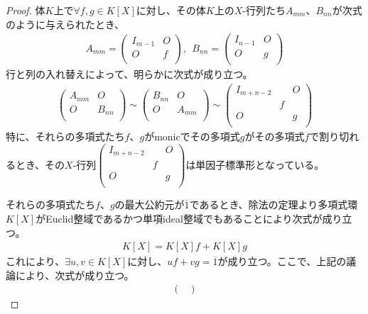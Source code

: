 \documentclass[dvipdfmx]{jsarticle}
\begin{document}
\begin{proof}
体$K$上で$\forall f,g \in K[ X]$に対し、その体$K$上の$X$-行列たち$A_{mm}$、$B_{nn}$が次式のように与えられたとき、
\begin{align*}
A_{mm} = \begin{pmatrix}
I_{m - 1} & O \\
O & f \\
\end{pmatrix},\ \ B_{nn} = \begin{pmatrix}
I_{n - 1} & O \\
O & g \\
\end{pmatrix}
\end{align*}
行と列の入れ替えによって、明らかに次式が成り立つ。
\begin{align*}
\begin{pmatrix}
A_{mm} & O \\
O & B_{nn} \\
\end{pmatrix} \sim \begin{pmatrix}
B_{nn} & O \\
O & A_{mm} \\
\end{pmatrix} \sim \begin{pmatrix}
I_{m + n - 2} & \  & O \\
\  & f & \  \\
O & \  & g \\
\end{pmatrix}
\end{align*}
特に、それらの多項式たち$f$、$g$がmonicでその多項式$g$がその多項式$f$で割り切れるとき、その$X$-行列$\begin{pmatrix}
I_{m + n - 2} & \  & O \\
\  & f & \  \\
O & \  & g \\
\end{pmatrix}$は単因子標準形となっている。\par
それらの多項式たち$f$、$g$の最大公約元が$\overline{1}$であるとき、除法の定理より多項式環$K[ X]$がEuclid整域であるかつ単項ideal整域でもあることにより次式が成り立つ。
\begin{align*}
K[ X] = K[ X] f + K[ X] g
\end{align*}
これにより、$\exists u,v \in K[ X]$に対し、$uf + vg = \overline{1}$が成り立つ。ここで、上記の議論により、次式が成り立つ。
\begin{align*}
\begin{pmatrix}

\end{pmatrix}
\end{align*}
\end{proof}
\end{document}
